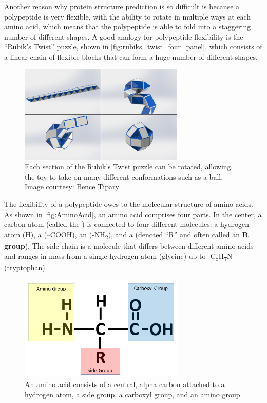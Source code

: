 Another reason why protein structure prediction is so difficult is because a polypeptide is very flexible, with the ability to rotate in multiple ways at each amino acid, which means that the polypeptide is able to fold into a staggering number of different shapes. A good analogy for polypeptide flexibility is the ``Rubik's Twist'' puzzle, shown in \autoref{fig:rubiks_twist_four_panel}, which consists of a linear chain of flexible blocks that can form a huge number of different shapes.

\begin{figure}[h]
	\centering
	\mySfFamily
	\includegraphics[width = 0.7\textwidth]{../images/rubiks_twist_four_panel.jpg}
	\caption{Each section of the Rubik's Twist puzzle can be rotated, allowing the toy to take on many different conformations such as a ball. Image courtesy: Bence Tipary}
	\label{fig:rubiks_twist_four_panel}
\end{figure}

The flexibility of a polypeptide owes to the molecular structure of amino acids. As shown in \autoref{fig:AminoAcid}, an amino acid comprises four parts. In the center, a carbon atom (called the ) is connected to four different molecules: a hydrogen atom (H), a  (–COOH), an  (-NH\textsubscript{2}), and a  (denoted ``R'' and often called an \textbf{R group}). The side chain is a molecule that differs between different amino acids and ranges in mass from a single hydrogen atom (glycine) up to -C\textsubscript{8}H\textsubscript{7}N (tryptophan).

\begin{figure}[h]
	\centering
	\mySfFamily
	\includegraphics[width = 0.7\textwidth]{../images/AminoAcid.png}
	\caption{An amino acid consists of a central, alpha carbon attached to a hydrogen atom, a side group, a carboxyl group, and an amino group.}
	\label{fig:AminoAcid}
\end{figure}

